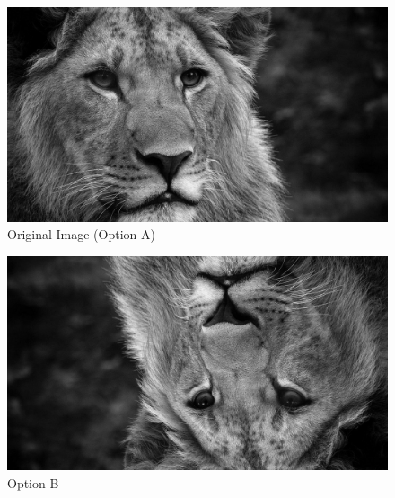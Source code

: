 \documentclass{ximera}
\begin{document}
\begin{problem}
\begin{selectAll}
  \end{selectAll}

  
    \begin{figure}[h]
      \centering
        \includegraphics[width=.5\textwidth]{test_image.jpg}
        \caption{Original Image (Option A)}
        \label{fig:original}
    \end{figure}
  
      \begin{figure}[h]
        \centering
        \includegraphics[width=.5\textwidth]{test_image_rot_2.jpg}
        \caption{Option B}
        \label{fig:optionA}
    \end{figure}


\end{problem}
\end{document}
